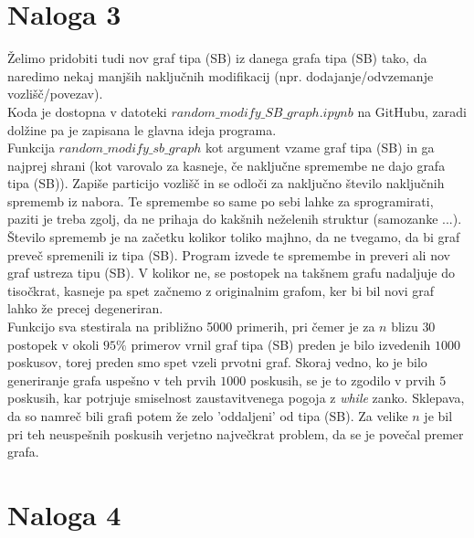 \documentclass{article}
\begin{document}
\section{Naloga 3}

Želimo pridobiti tudi nov graf tipa (SB) iz danega grafa tipa (SB) tako, 
da naredimo nekaj manjših naključnih modifikacij (npr. dodajanje/odvzemanje 
vozlišč/povezav). 
\\
Koda je dostopna v datoteki $random\_modify\_SB\_graph.ipynb$ na GitHubu, zaradi 
dolžine pa je zapisana le glavna ideja programa. 
\\Funkcija $random\_modify\_sb\_graph$ kot argument vzame graf tipa (SB) in 
ga najprej shrani (kot varovalo za kasneje, če naključne spremembe ne dajo 
grafa tipa (SB)). Zapiše particijo vozlišč in se odloči za naključno število 
naključnih sprememb iz nabora. Te spremembe so same po sebi lahke za sprogramirati, paziti 
je treba zgolj, da ne prihaja do kakšnih neželenih struktur (samozanke ...). Število sprememb je na začetku kolikor toliko majhno, da ne tvegamo,
da bi graf preveč spremenili iz tipa (SB). Program izvede te spremembe in preveri ali nov graf ustreza tipu (SB).
V kolikor ne, se postopek na takšnem grafu nadaljuje do tisočkrat, kasneje pa 
spet začnemo z originalnim grafom, ker bi bil novi graf lahko že precej degeneriran.
\\
Funkcijo sva stestirala na približno 5000 primerih, pri čemer je za $n$ blizu $30$ postopek 
v okoli $95 \%$ primerov vrnil graf tipa (SB) preden je bilo izvedenih $1000$ poskusov, torej preden smo  
spet vzeli prvotni graf. Skoraj vedno, ko je bilo generiranje grafa uspešno v teh prvih $1000$ poskusih,
se je to zgodilo v prvih $5$ poskusih, kar potrjuje smiselnost zaustavitvenega pogoja z \emph{while} zanko.
Sklepava, da so namreč bili grafi potem že zelo 'oddaljeni' od tipa (SB). Za velike $n$ je bil pri teh neuspešnih 
poskusih verjetno največkrat problem, da se je povečal premer grafa.

\section{Naloga 4}
\end{document}
